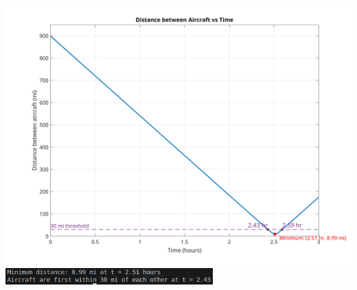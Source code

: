 \documentclass[a4paper, 12pt]{report}
\def\link{blue!50!black}
\begin{document}
    
    
    
    

    \includegraphics[width=1\textwidth]{images/aircraft_distance_plot.png}
    \includegraphics[width=0.6\textwidth]{images/q10.png}
    
    \newpage
    
\end{document}
